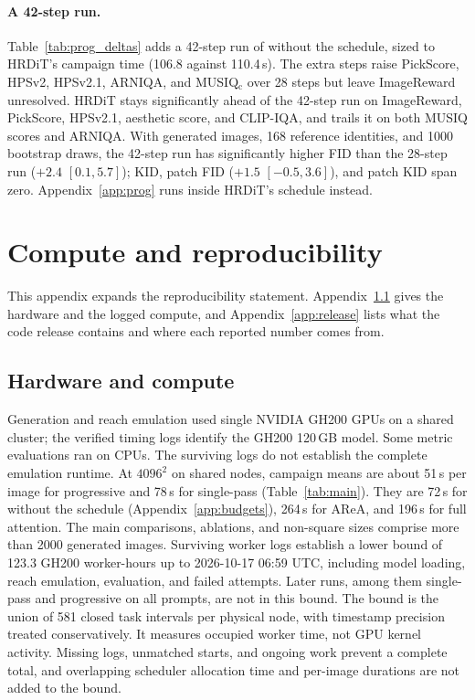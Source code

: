 \paragraph{A 42-step run.} Table~\ref{tab:prog_deltas} adds a 42-step run of \sca{} without the schedule, sized to HRDiT's campaign time (106.8 against 110.4\,s). The extra steps raise PickScore, HPSv2, HPSv2.1, ARNIQA, and MUSIQ$_\text{c}$ over 28 steps but leave ImageReward unresolved. HRDiT stays significantly ahead of the 42-step run on ImageReward, PickScore, HPSv2.1, aesthetic score, and CLIP-IQA, and trails it on both MUSIQ scores and ARNIQA. With \npanel{} generated images, 168 reference identities, and 1000 bootstrap draws, the 42-step run has significantly higher FID than the 28-step run ($+2.4$ $[0.1,5.7]$); KID, patch FID ($+1.5$ $[-0.5,3.6]$), and patch KID span zero. Appendix~\ref{app:prog} runs \sca{} inside HRDiT's schedule instead.


\apxbarrier
\section{Compute and reproducibility}
\label{app:compute}

This appendix expands the reproducibility statement. Appendix~\ref{app:hardware} gives the hardware and the logged compute, and Appendix~\ref{app:release} lists what the code release contains and where each reported number comes from.

\subsection{Hardware and compute}
\label{app:hardware}

Generation and reach emulation used single NVIDIA GH200 GPUs on a shared cluster; the verified timing logs identify the GH200 120\,GB model. Some metric evaluations ran on CPUs. The surviving logs do not establish the complete emulation runtime. At $4096^2$ on shared nodes, campaign means are about 51\,s per image for progressive \sca{} and 78\,s for single-pass \sca{} (Table~\ref{tab:main}). They are 72\,s for \sca{} without the schedule (Appendix~\ref{app:budgets}), 264\,s for AReA, and 196\,s for full attention. The main comparisons, ablations, and non-square sizes comprise more than 2000 generated images. Surviving worker logs establish a lower bound of 123.3 GH200 worker-hours up to 2026-10-17 06:59 UTC, including model loading, reach emulation, evaluation, and failed attempts. Later runs, among them single-pass and progressive \sca{} on all prompts, are not in this bound. The bound is the union of 581 closed task intervals per physical node, with timestamp precision treated conservatively. It measures occupied worker time, not GPU kernel activity. Missing logs, unmatched starts, and ongoing work prevent a complete total, and overlapping scheduler allocation time and per-image durations are not added to the bound.

